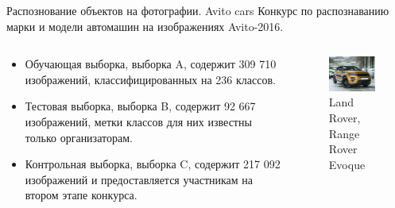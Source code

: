 \documentclass{beamer}
\begin{document}
\begin{frame}{Распознование объектов на фотографии. Avito cars}
    Конкурс по распознаванию марки и модели автомашин на изображениях Avito-2016.
    \begin{columns}
        \begin{column}{0.75\textwidth}
            \begin{itemize}
                \item Обучающая выборка, выборка A, содержит 309 710 изображений, классифицированных на 236 классов.
                \item Тестовая выборка, выборка B, содержит 92 667 изображений, метки классов для них известны только организаторам.
                \item Контрольная выборка, выборка C, содержит 217 092 изображений и предоставляется участникам на втором этапе конкурса.
            \end{itemize}
        \end{column}
        \begin{column}{0.25\textwidth}
            \begin{figure}
                \includegraphics[width=\textwidth]{fig/233px-Avito-2016_Land_Rover_Range_Rover_Evoque.jpg}
                \caption{\tiny Land Rover, Range Rover Evoque}
            \end{figure}
            \begin{figure}

\end{figure}
\end{column}
\end{columns}
\end{frame}
\end{document}
